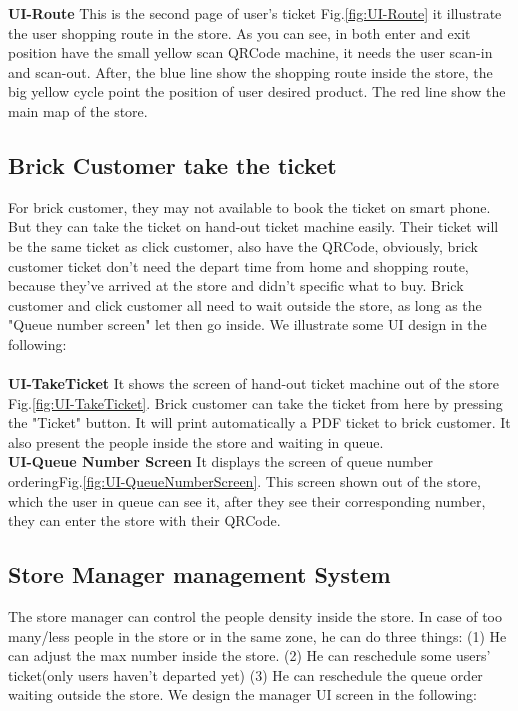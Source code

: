 \documentclass[a4paper,12pt]{report}
\begin{document}
\textbf{UI-Route} This is the second page of user's ticket Fig.\ref{fig:UI-Route} it illustrate the user shopping route in the store. As you can see, in both enter and exit position have the small yellow scan QRCode machine, it needs the user scan-in and scan-out. After, the blue line show the shopping route inside the store, the big yellow cycle point the position of user desired product. The red line show the main map of the store.~\\

\subsection{Brick Customer take the ticket}
For brick customer, they may not available to book the ticket on smart phone. But they can take the ticket on hand-out ticket machine easily. Their ticket will be the same ticket as click customer, also have the QRCode, obviously, brick customer ticket don't need the depart time from home and shopping route, because they've arrived at the store and didn't specific what to buy. Brick customer and click customer all need to wait outside the store, as long as the "Queue number screen" let then go inside. We illustrate some UI design in the following:~\\
~\\
 
\textbf{UI-TakeTicket} It shows the screen of hand-out ticket machine out of the store Fig.\ref{fig:UI-TakeTicket}. Brick customer can take the ticket from here by pressing the "Ticket" button. It will print automatically a PDF ticket to brick customer. It also present the people inside the store and waiting in queue.~\\

\textbf{UI-Queue Number Screen} It displays the screen of queue number orderingFig.\ref{fig:UI-QueueNumberScreen}. This screen shown out of the store, which the user in queue can see it, after they see their corresponding number, they can enter the store with their QRCode.~\\

\subsection{Store Manager management System}
The store manager can control the people density inside the store. In case of too many/less people in the store or in the same zone, he can do three things: (1) He can adjust the max number inside the store. (2) He can reschedule some users' ticket(only users haven't departed yet) (3) He can reschedule the queue order waiting outside the store. We design the manager UI screen in the following:~\\
~\\
\end{document}
